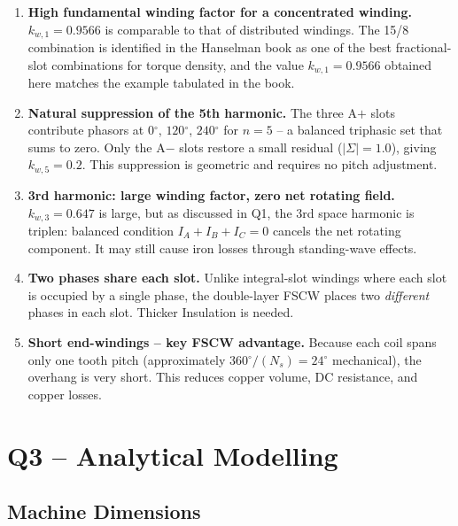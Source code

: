\documentclass[12pt,a4paper]{article}
\newcommand{\degree}{\ensuremath{^{\circ}}}
\begin{document}
\begin{enumerate}

\item \textbf{High fundamental winding factor for a concentrated winding.}
  $k_{w,1} = 0.9566$ is comparable to that of distributed windings.
  The 15/8 combination is identified in the Hanselman book as one of the
  best fractional-slot combinations for torque density, and the value
  $k_{w,1} = 0.9566$ obtained here matches the example tabulated in the book.

\item \textbf{Natural suppression of the 5th harmonic.}
  The three A$+$ slots contribute phasors at $0\degree$, $120\degree$,
  $240\degree$ for $n=5$ -- a balanced triphasic set that sums to zero.
  Only the A$-$ slots restore a small residual ($|\Sigma|=1.0$),
  giving $k_{w,5} = 0.2$.
  This suppression is geometric and requires no pitch adjustment.

\item \textbf{3rd harmonic: large winding factor, zero net rotating field.}
  $k_{w,3} = 0.647$ is large, but as discussed in Q1, the 3rd space
  harmonic is triplen: balanced condition $I_A + I_B + I_C = 0$ cancels the
  net rotating component.
  It may still cause iron losses through standing-wave effects.

\item \textbf{Two phases share each slot.}
  Unlike integral-slot windings where each slot is occupied by a single
  phase, the double-layer FSCW places two \emph{different} phases in each
  slot. Thicker Insulation is needed.

\item \textbf{Short end-windings -- key FSCW advantage.}
  Because each coil spans only one tooth pitch (approximately
  $360\degree/(N_s) = 24\degree$ mechanical), the overhang is very short.
  This reduces copper volume, DC resistance, and copper losses.

\end{enumerate}

\section{Q3 -- Analytical Modelling}
\label{sec:q3}

\subsection{Machine Dimensions}
\end{document}
